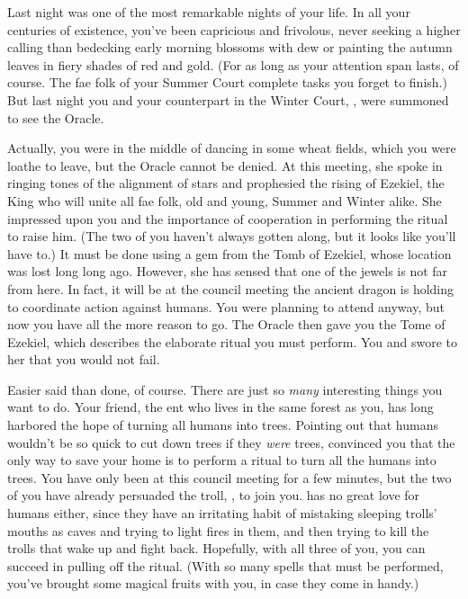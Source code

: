 \documentclass[char]{guildcamp2}
\begin{document}
\name{\cTreeFae{}}


Last night was one of the most remarkable nights of your life.  In all your centuries of existence, you've been capricious and frivolous, never seeking a higher calling than bedecking early morning blossoms with dew or painting the autumn leaves in fiery shades of red and gold.  (For as long as your attention span lasts, of course.  The fae folk of your Summer Court complete tasks you forget to finish.)  But last night you and your counterpart in the Winter Court, \cBabyFae{\intro}, were summoned to see the Oracle.

Actually, you were in the middle of dancing in some wheat fields, which you were loathe to leave, but the Oracle cannot be denied.  At this meeting, she spoke in ringing tones of the alignment of stars and prophesied the rising of Ezekiel, the King who will unite all fae folk, old and young, Summer and Winter alike.  She impressed upon you and \cBabyFae{} the importance of cooperation in performing the ritual to raise him.  (The two of you haven't always gotten along, but it looks like you'll have to.)  It must be done using a gem from the Tomb of Ezekiel, whose location was lost long long ago.  However, she has sensed that one of the jewels is not far from here.  In fact, it will be at the council meeting the ancient dragon \cOnyx{\intro} is holding to coordinate action against humans.  You were planning to attend anyway, but now you have all the more reason to go.  The Oracle then gave you the Tome of Ezekiel, which describes the elaborate ritual you must perform.  You and \cBabyFae{} swore to her that you would not fail.

Easier said than done, of course.  There are just so \emph{many} interesting things you want to do.  Your friend, the ent \cEnt{\intro} who lives in the same forest as you, has long harbored the hope of turning all humans into trees.  Pointing out that humans wouldn't be so quick to cut down trees if they \emph{were} trees, \cEnt{\they} convinced you that the only way to save your home is to perform a ritual to turn all the humans into trees.  You have only been at this council meeting for a few minutes, but the two of you have already persuaded the troll, \cTroll{\intro}, to join you.  \cTroll{\They} has no great love for humans either, since they have an irritating habit of mistaking sleeping trolls' mouths as caves and trying to light fires in them, and then trying to kill the trolls that wake up and fight back.  Hopefully, with all three of you, you can succeed in pulling off the ritual.  (With so many spells that must be performed, you've brought some magical fruits with you, in case they come in handy.)
\end{document}
